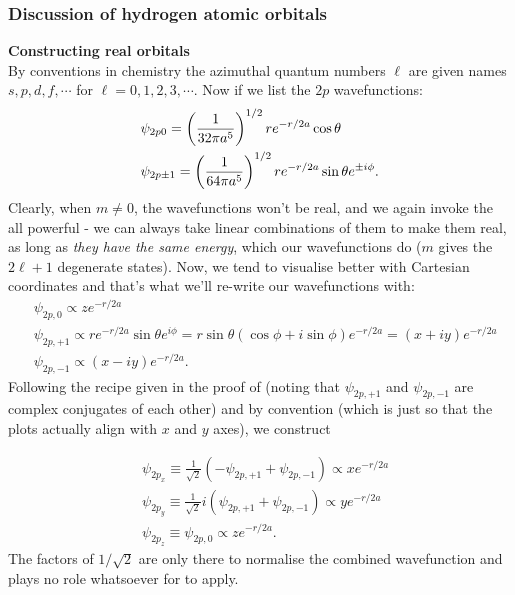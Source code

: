 \subsubsection{Discussion of hydrogen atomic orbitals}
\textbf{Constructing real orbitals}\\
By conventions in chemistry the azimuthal quantum numbers $\ell$ are given 
names $s,p,d,f,\cdots$ for $\ell=0,1,2,3,\cdots$. Now if we list the $2p$ 
wavefunctions:
\begin{equation}
\begin{aligned}
&\psi_{2p0}=\left(\frac{1}{32\pi a^5}\right)^{1/2}re^{-r/2a}\cos\theta\\
&\psi_{2p\pm1}=\left(\frac{1}{64\pi a^5}\right)^{1/2}re^{-r/2a}\sin\theta e^{\pm i\phi}.
\end{aligned}
\end{equation}
Clearly, when $m\neq0$, the wavefunctions won't be real, and we again invoke 
the all powerful  - we can always take linear combinations of 
them to make them real, as long as \textit{they have the same energy}, which 
our wavefunctions do ($m$ gives the $2\ell+1$ degenerate states). 
Now, we tend to visualise better with Cartesian coordinates and that's what we'll 
re-write our wavefunctions with:
\begin{equation}
\begin{aligned}
&\psi_{2p,0}\propto ze^{-r/2a}\\
&\psi_{2p,+1}\propto re^{-r/2a}\sin\theta e^{i\phi}=r\sin\theta(\cos\phi+i\sin\phi)e^{-r/2a}=(x+iy)e^{-r/2a}\\
&\psi_{2p,-1}\propto (x-iy)e^{-r/2a}.
\end{aligned}
\end{equation}
Following the recipe given in the proof of  (noting that 
$\psi_{2p,+1}$ and $\psi_{2p,-1}$ are complex conjugates of each other) 
and by convention (which is just so that the plots actually align 
with $x$ and $y$ axes), we construct
\begin{defi}
\begin{subequations}
\begin{align}
&\psi_{2p_x}\equiv\frac{1}{\sqrt{2}}(-\psi_{2p,+1}+\psi_{2p,-1})\propto xe^{-r/2a}\\
&\psi_{2p_y}\equiv\frac{1}{\sqrt{2}}i(\psi_{2p,+1}+\psi_{2p,-1})\propto ye^{-r/2a}\\
&\psi_{2p_z}\equiv\psi_{2p,0}\propto ze^{-r/2a}.
\end{align}
\end{subequations}
The factors of $1/\sqrt{2}$ are only there to normalise the combined wavefunction 
and plays no role whatsoever for  to apply.
\end{defi}
